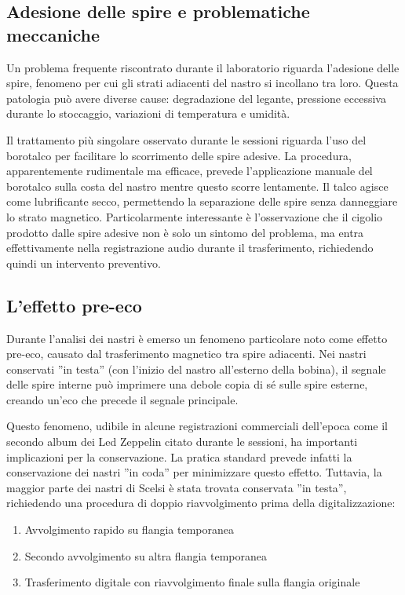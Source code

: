 \subsection{Adesione delle spire e problematiche meccaniche}
Un problema frequente riscontrato durante il laboratorio riguarda l'adesione delle spire, fenomeno per cui gli strati adiacenti del nastro si incollano tra loro. Questa patologia può avere diverse cause: degradazione del legante, pressione eccessiva durante lo stoccaggio, variazioni di temperatura e umidità.

Il trattamento più singolare osservato durante le sessioni riguarda l'uso del borotalco per facilitare lo scorrimento delle spire adesive. La procedura, apparentemente rudimentale ma efficace, prevede l'applicazione manuale del borotalco sulla costa del nastro mentre questo scorre lentamente. Il talco agisce come lubrificante secco, permettendo la separazione delle spire senza danneggiare lo strato magnetico. Particolarmente interessante è l'osservazione che il cigolio prodotto dalle spire adesive non è solo un sintomo del problema, ma entra effettivamente nella registrazione audio durante il trasferimento, richiedendo quindi un intervento preventivo.
\subsection{L'effetto pre-eco}
Durante l'analisi dei nastri è emerso un fenomeno particolare noto come effetto pre-eco, causato dal trasferimento magnetico tra spire adiacenti. Nei nastri conservati ''in testa'' (con l'inizio del nastro all'esterno della bobina), il segnale delle spire interne può imprimere una debole copia di sé sulle spire esterne, creando un'eco che precede il segnale principale.

Questo fenomeno, udibile in alcune registrazioni commerciali dell'epoca come il secondo album dei Led Zeppelin citato durante le sessioni, ha importanti implicazioni per la conservazione. La pratica standard prevede infatti la conservazione dei nastri ''in coda'' per minimizzare questo effetto. Tuttavia, la maggior parte dei nastri di Scelsi è stata trovata conservata ''in testa'', richiedendo una procedura di doppio riavvolgimento prima della digitalizzazione:

\begin{enumerate}
    \item Avvolgimento rapido su flangia temporanea
    \item Secondo avvolgimento su altra flangia temporanea  
    \item Trasferimento digitale con riavvolgimento finale sulla flangia originale
\end{enumerate}

